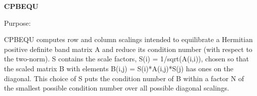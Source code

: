 {\bfseries C\+P\+B\+E\+Q\+U} 

 \begin{DoxyParagraph}{Purpose\+: }
\begin{DoxyVerb} CPBEQU computes row and column scalings intended to equilibrate a
 Hermitian positive definite band matrix A and reduce its condition
 number (with respect to the two-norm).  S contains the scale factors,
 S(i) = 1/sqrt(A(i,i)), chosen so that the scaled matrix B with
 elements B(i,j) = S(i)*A(i,j)*S(j) has ones on the diagonal.  This
 choice of S puts the condition number of B within a factor N of the
 smallest possible condition number over all possible diagonal
 scalings.\end{DoxyVerb}
 
\end{DoxyParagraph}

